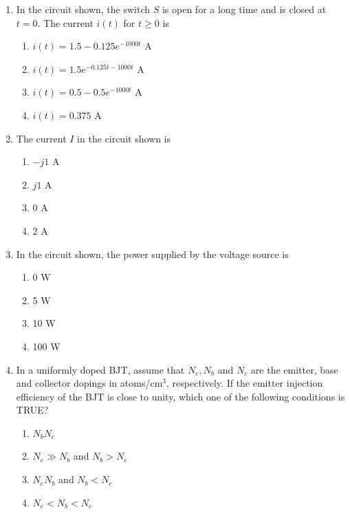\documentclass[journal,12pt,onecolumn]{IEEEtran}
\begin{document}
\begin{enumerate}
\item In the circuit shown, the switch $S$ is open for a long time and is closed at $t=0$. The current $i(t)$ for $t\ge 0$ is
\begin{multicols}{2}
\begin{enumerate}
\item $i(t)=1.5-0.125e^{-1000t}$ A
\item $i(t)=1.5e^{-0.125t-1000t}$ A
\item $i(t)=0.5-0.5e^{-1000t}$ A
\item $i(t)=0.375$ A
\end{enumerate}
\end{multicols}

\item The current $I$ in the circuit shown is
\begin{multicols}{2}
\begin{enumerate}
\item $-j1$ A
\item $j1$ A
\item 0 A
\item 2 A
\end{enumerate}
\end{multicols}

\item In the circuit shown, the power supplied by the voltage source is
\begin{multicols}{2}
\begin{enumerate}
\item 0 W
\item 5 W
\item 10 W
\item 100 W
\end{enumerate}
\end{multicols}

\item In a uniformly doped BJT, assume that $N_e, N_b$ and $N_c$ are the emitter, base and collector dopings in atoms/cm$^3$, respectively. If the emitter injection efficiency of the BJT is close to unity, which one of the following conditions is TRUE?
\begin{multicols}{2}
\begin{enumerate}
\item $N_b N_c$
\item $N_e \gg N_b$ and $N_b > N_c$
\item $N_e N_b$ and $N_b < N_c$
\item $N_e < N_b < N_c$
\end{enumerate}
\end{multicols}


\end{enumerate}
\end{document}
